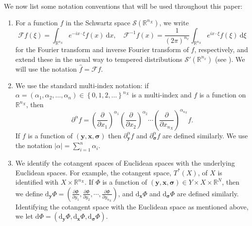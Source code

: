 \documentclass[a4paper,12pt]{amsart}
\numberwithin{equation}{section}
\theoremstyle{plain}
\numberwithin{theorem}{section}
\theoremstyle{definition}
\theoremstyle{remark}
\theoremstyle{remark}
\theoremstyle{remark}
\newcommand{\al}{\alpha}
\newcommand{\smo}{\setminus \mathbf{0}}
\newcommand{\paren}[1]{\left(#1\right)}               %
\newcommand{\sparen}[1]{\left\{#1\right\}}      %
\renewcommand{\d}{\,\mathrm{d}}  %
\newcommand{\dd}{\mathrm{d}}  %
\newcommand{\Fc}{\mathcal{F}}
\newcommand{\Sc}{\mathcal{S}}
\newcommand{\inv}{^{-1}}
\newcommand{\partyf}[2]{\frac{\partial #2}{\partial y_{#1}}}
\newcommand{\vx}{{\mathbf{x}}}
\newcommand{\vy}{{\mathbf{y}}}
\newcommand{\vz}{{\mathbf{z}}}
\newcommand{\vsig}{{\boldsymbol{\sigma}}} %
\newcommand{\rr}{{{\mathbb R}}}
\begin{document}
We now list some notation conventions that will be used throughout this paper:
\begin{enumerate}
\item For a function $f$ in the Schwartz space $\Sc(\mathbb{R}^{n_X})$, we {write
\[
\mathcal{F}f(\xi) = \int_{\mathbb{R}^{n_X}} e^{-i x\cdot \xi}f(x)\ \dd x,\quad \mathcal{F}^{-1}f(x) = \frac{1}{(2 \pi)^{n_x}}\int_{\mathbb{R}^{n_X}} e^{i x\cdot \xi}f(\xi)\ \dd \xi
\]
for} the Fourier transform and inverse Fourier transform of $f$,
respectively, {and extend these in the usual way to tempered distributions $\Sc'(\mathbb{R}^{n_x})$} (see \cite[Definition 7.1.1]{hormanderI}). We will use the notation $\hat{f} = \mathcal{F}f$. %

\item We use the standard multi-index notation: if
$\al=(\al_1,\al_2,\dots,\al_n)\in \sparen{0,1,2,\dots}^{n_X}$
is a multi-index and $f$ is a function on $\mathbb{R}^{n_X}$, then
\[\partial^\al f=\paren{\frac{\partial}{\partial
x_1}}^{\al_1}\paren{\frac{\partial}{\partial
x_2}}^{\al_2}\cdots\paren{\frac{\partial}{\partial x_{n_X}}}^{\al_{n_X}}
f.\] If $f$ is a function of $(\vy,\vx,\vsig)$ then $\partial^\al_\vy f$ and $\partial^\al_\vsig f$ are defined similarly. We use the notation $|\alpha| = \sum_{i=1}^n \alpha_i$.



\item \label{item:T*Xident} We identify the cotangent
spaces of Euclidean spaces with the underlying Euclidean spaces. For example, the cotangent space, 
$T^*(X)$, of $X$ is identified with $X\times \mathbb{R}^{n_X}$. If $\Phi$ is a function of $(\vy,\vx,\vsig)\in Y\times X\times \rr^N$,
then we define $\dd_{\vy} \Phi = \paren{\partyf{1}{\Phi},
\partyf{2}{\Phi}, \cdots, \partyf{{n_X}}{\Phi} }$, and $\dd_\vx\Phi$ and $
\dd_{\vsig} \Phi $ are defined similarly. Identifying the cotangent space with the Euclidean space as mentioned above, we let $\dd\Phi =
\paren{\dd_{\vy} \Phi, \dd_{\vx} \Phi,\dd_{\vsig} \Phi}$.



\end{enumerate}
\end{document}
